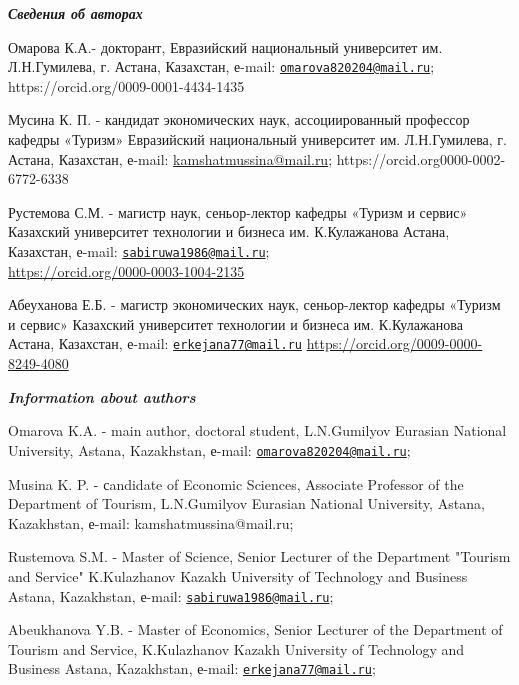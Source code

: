 \begin{authorinfo}
\emph{{\bfseries Сведения об авторах}}

Омарова К.А.- докторант, Евразийский национальный университет им.
Л.Н.Гумилева, г. Астана, Казахстан, е-mail:
\href{mailto:omarova820204@mail.ru}{\nolinkurl{omarova820204@mail.ru}};
https://orcid.org/0009-0001-4434-1435

Мусина К. П. - кандидат экономических наук, ассоциированный профессор
кафедры «Туризм» Евразийский национальный университет им. Л.Н.Гумилева,
г. Астана, Казахстан, е-mail:
\href{mailto:2kamshatmussina@mail.ru}{kamshatmussina@mail.ru};
https://orcid.org0000-0002-6772-6338

Рустемова С.М. - магистр наук, сеньор-лектор кафедры «Туризм и сервис»
Казахский университет технологии и бизнеса им. К.Кулажанова Астана,
Казахстан, е-mail:
\href{mailto:sabiruwa1986@mail.ru}{\nolinkurl{sabiruwa1986@mail.ru}};\\
\url{https://orcid.org/0000-0003-1004-2135}

Абеуханова Е.Б. - магистр экономических наук, сеньор-лектор кафедры
«Туризм и сервис» Казахский университет технологии и бизнеса им.
К.Кулажанова Астана, Казахстан, е-mail:
\href{mailto:erkejana77@mail.ru}{\nolinkurl{erkejana77@mail.ru}}
\url{https://orcid.org/0009-0000-8249-4080}

\emph{{\bfseries Information about authors}}

Omarova K.A. - main author, doctoral student, L.N.Gumilyov Eurasian
National University, Astana, Kazakhstan, е-mail:
\href{mailto:omarova820204@mail.ru}{\nolinkurl{omarova820204@mail.ru}};

Musina K. P. - сandidate of Economic Sciences, Associate Professor of
the Department of Tourism, L.N.Gumilyov Eurasian National University,
Astana, Kazakhstan, е-mail: kamshatmussina@mail.ru;

Rustemova S.M. - Master of Science, Senior Lecturer of the Department
"Tourism and Service" K.Kulazhanov Kazakh University of Technology and
Business Astana, Kazakhstan, е-mail:
\href{mailto:sabiruwa1986@mail.ru}{\nolinkurl{sabiruwa1986@mail.ru}};

Abeukhanova Y.B. - Master of Economics, Senior Lecturer of the
Department of Tourism and Service, K.Kulazhanov Kazakh University of
Technology and Business Astana, Kazakhstan, е-mail:
\href{mailto:erkejana77@mail.ru}{\nolinkurl{erkejana77@mail.ru}};
\end{authorinfo}
